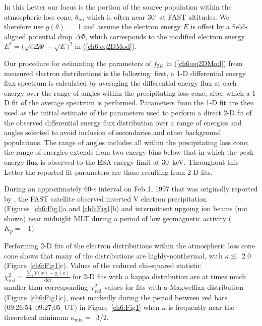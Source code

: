 
  In this Letter our focus is the portion of the source population
  within the atmospheric loss cone, $\theta_{\textrm{lc}}$, which is
  often near 30$^\circ$ at FAST altitudes. We therefore use $g(\theta)
  =$~1 and assume the electron energy $E$ is offset by a field-aligned
  potential drop $\Delta \Phi$, which corresponds to the modified
  electron energy $E^* = \big( \sqrt{e \Delta \Phi} - \sqrt{E}
  \big)^2$ in (\ref{ch6:eq2DMod}).

  Our procedure for estimating the parameters of $f_{2D}$ in
  (\ref{ch6:eq2DMod}) from measured electron distributions is the
  following: first, a 1-D differential energy flux spectrum is
  calculated by averaging the differential energy flux at each energy
  over the range of angles within the precipitating loss cone, after
  which a 1-D fit of the average spectrum is performed. Parameters
  from the 1-D fit are then used as the initial estimate of the
  parameters used to perform a direct 2-D fit of the observed
  differential energy flux distribution over a range of energies and
  angles selected to avoid inclusion of secondaries and other
  background populations. The range of angles includes all within the
  precipitating loss cone; the range of energies extends from two
  energy bins below that in which the peak energy flux is observed to
  the ESA energy limit at 30~keV. Throughout this Letter the reported
  fit parameters are those resulting from 2-D fits.

  During an approximately 60-s interval on Feb 1, 1997 that was
  originally reported by \citet{Elphic1998}, the FAST satellite
  observed inverted V electron precipitation (Figures~\ref{ch6:Fig1}a and
  \ref{ch6:Fig1}b) and intermittent upgoing ion beams (not shown) near
  midnight MLT during a period of low geomagnetic activity ($K_p =
  -1$).

  Performing 2-D fits of the electron distributions within the
  atmospheric loss cone cone shows that many of the distributions are
  highly-nonthermal, with $\kappa \lesssim$~2.0
  (Figure~\ref{ch6:Fig1}c). Values of the reduced chi-squared statistic
  $\chi^2_{\mathrm{red}} = \frac{\sum_i Y(x) - y_i(x)}{\mathrm{dof}}$
  for 2-D fits with a kappa distribution are at times much smaller
  than corresponding $\chi^2_{\textrm{red}}$ values for fits with a
  Maxwellian distribution (Figure~\ref{ch6:Fig1}c), most markedly during
  the period between red bars (09:26:54--09:27:05~UT) in
  Figure~\ref{ch6:Fig1} when $\kappa$ is frequently near the theoretical
  minimum $\kappa_{\mathrm{min}} =$~3/2.

